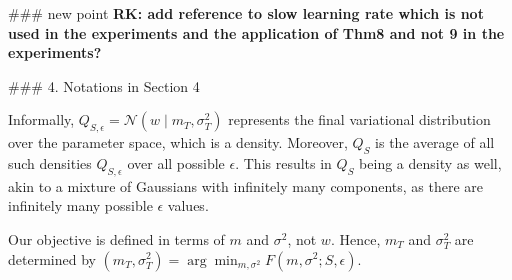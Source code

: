\documentclass{article}
\begin{document}
\begin{markdown}
### new point
{\bf RK: add reference to slow learning rate which is not used in the experiments and the application of Thm8 and not 9 in the experiments?}

### 4. Notations in Section 4

Informally, $Q_{S, \epsilon} = \mathcal{N}(w \mid m_T, \sigma_T^2)$ represents the final variational distribution over the parameter space, which is a density. Moreover, $Q_S$ is the average of all such densities $Q_{S, \epsilon}$ over all possible $\epsilon$. This results in $Q_S$ being a density as well, akin to a mixture of Gaussians with infinitely many components, as there are infinitely many possible $\epsilon$ values.

Our objective is defined in terms of $m$ and $\sigma^2$, not $w$. Hence, $m_T$ and $\sigma_T^2$ are determined by  
$(m_T, \sigma_T^2) = \arg\min_{m, \sigma^2} F(m, \sigma^2; S, \epsilon).$

\end{markdown}
\end{document}
